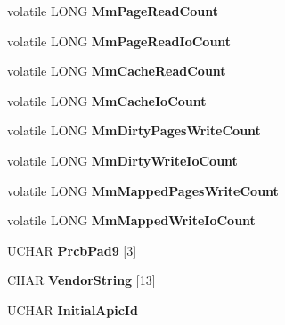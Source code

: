 \begin{DoxyCompactItemize}
volatile L\+O\+NG {\bfseries Mm\+Page\+Read\+Count}
\item 
\mbox{\label{struct___k_p_r_c_b_a275cd5d1f792d15de256f8bc77b829ba}} 
volatile L\+O\+NG {\bfseries Mm\+Page\+Read\+Io\+Count}
\item 
\mbox{\label{struct___k_p_r_c_b_a752aff943b9c757e8c87f2cd00943ba6}} 
volatile L\+O\+NG {\bfseries Mm\+Cache\+Read\+Count}
\item 
\mbox{\label{struct___k_p_r_c_b_a53f96a22c013f3b12bc86cad50d59323}} 
volatile L\+O\+NG {\bfseries Mm\+Cache\+Io\+Count}
\item 
\mbox{\label{struct___k_p_r_c_b_a9c25c957f29ab85e614ac0a4d516f01b}} 
volatile L\+O\+NG {\bfseries Mm\+Dirty\+Pages\+Write\+Count}
\item 
\mbox{\label{struct___k_p_r_c_b_ab8edd766e9b224f2d16f9662d1d30721}} 
volatile L\+O\+NG {\bfseries Mm\+Dirty\+Write\+Io\+Count}
\item 
\mbox{\label{struct___k_p_r_c_b_ab23b5d1d9ef3e85aee0013bde45a82d1}} 
volatile L\+O\+NG {\bfseries Mm\+Mapped\+Pages\+Write\+Count}
\item 
\mbox{\label{struct___k_p_r_c_b_a51e27b050e40819f74acb8472db6f518}} 
volatile L\+O\+NG {\bfseries Mm\+Mapped\+Write\+Io\+Count}
\item 
\mbox{\label{struct___k_p_r_c_b_a961c2503f1a8c3529af195a719099825}} 
U\+C\+H\+AR {\bfseries Prcb\+Pad9} \mbox{[}3\mbox{]}
\item 
\mbox{\label{struct___k_p_r_c_b_ab67bd49dc5d027713fb106e57ce22e17}} 
C\+H\+AR {\bfseries Vendor\+String} \mbox{[}13\mbox{]}
\item 
\mbox{\label{struct___k_p_r_c_b_ac04d36f5c9427792ed57da22be033a74}} 
U\+C\+H\+AR {\bfseries Initial\+Apic\+Id}
\item 
\mbox{\label{struct___k_p_r_c_b_a777941b71996c5776cb5c651e5a9fd7a}} 

\end{DoxyCompactItemize}
